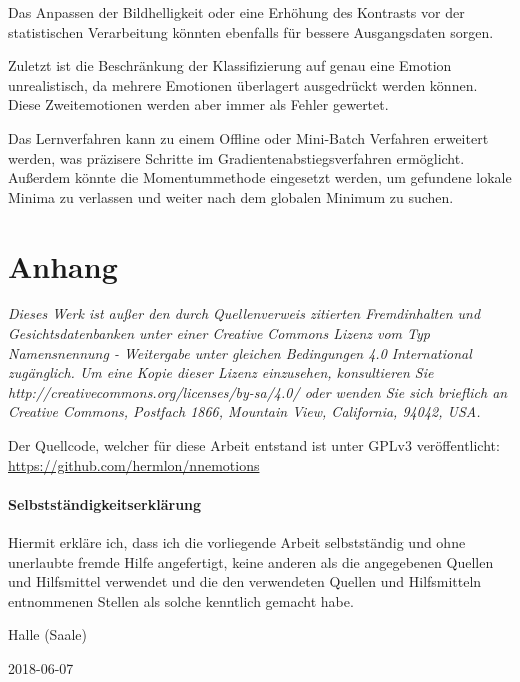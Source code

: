 \documentclass[12pt, a4paper]{article}
\begin{document}
Das Anpassen der Bildhelligkeit oder eine Erhöhung des Kontrasts vor der statistischen Verarbeitung könnten ebenfalls für bessere Ausgangsdaten sorgen.

Zuletzt ist die Beschränkung der Klassifizierung auf genau eine Emotion unrealistisch, da mehrere Emotionen überlagert ausgedrückt werden können. Diese Zweitemotionen werden aber immer als Fehler gewertet.

Das Lernverfahren kann zu einem Offline oder Mini-Batch Verfahren erweitert werden, was präzisere Schritte im Gradientenabstiegsverfahren ermöglicht. Außerdem könnte die Momentummethode eingesetzt werden, um gefundene lokale Minima zu verlassen und weiter nach dem globalen Minimum zu suchen.

\newpage
\nocite{db:cohn2}
\nocite{nnadl}
\nocite{nnsp}

\section{Anhang}
\printbibliography[heading=subbibintoc, keyword=book]
\printbibliography[heading=subbibintoc, type=online, title={Websites}]
\printbibliography[heading=subbibintoc, keyword=database, title={Datenbanken}]
\printbibliography[heading=subbibintoc, type=misc, title={Bild}]

\bigskip
\hrulefill

\textit{\small{Dieses Werk ist außer den durch Quellenverweis zitierten Fremdinhalten und Gesichtsdatenbanken unter einer Creative Commons Lizenz vom Typ Namensnennung - Weitergabe unter gleichen Bedingungen 4.0 International zugänglich. Um eine Kopie dieser Lizenz einzusehen, konsultieren Sie http://creativecommons.org/licenses/by-sa/4.0/ oder wenden Sie sich brieflich an Creative Commons, Postfach 1866, Mountain View, California, 94042, USA.}}

\bigskip
Der Quellcode, welcher für diese Arbeit entstand ist unter GPLv3 veröffentlicht: \url{https://github.com/hermlon/nnemotions}

\newpage
\paragraph{Selbstständigkeitserklärung}
Hiermit erkläre ich, dass ich die vorliegende Arbeit selbstständig und ohne unerlaubte fremde Hilfe angefertigt, keine anderen als die angegebenen Quellen und Hilfsmittel verwendet und die den verwendeten Quellen und Hilfsmitteln entnommenen Stellen als solche kenntlich gemacht habe.\cite{selbststaendigkeit}

\bigskip
\hfill
Halle (Saale)

\hfill
2018-06-07
\end{document}

